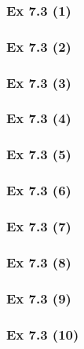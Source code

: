 \subsubsection{Ex 7.3 (1)}\label{sec:Ex_7.3.1}

\subsubsection{Ex 7.3 (2)}\label{sec:Ex_7.3.2}

\subsubsection{Ex 7.3 (3)}\label{sec:Ex_7.3.3}

\subsubsection{Ex 7.3 (4)}\label{sec:Ex_7.3.4}

\subsubsection{Ex 7.3 (5)}\label{sec:Ex_7.3.5}

\subsubsection{Ex 7.3 (6)}\label{sec:Ex_7.3.6}

\subsubsection{Ex 7.3 (7)}\label{sec:Ex_7.3.7}

\subsubsection{Ex 7.3 (8)}\label{sec:Ex_7.3.8}

\subsubsection{Ex 7.3 (9)}\label{sec:Ex_7.3.9}

\subsubsection{Ex 7.3 (10)}\label{sec:Ex_7.3.10}

